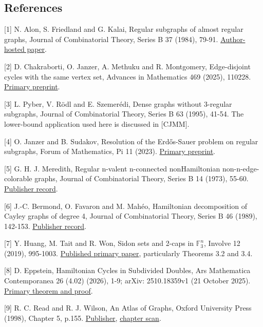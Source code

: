 \documentclass[
  11pt,
]{article}
\begin{document}
\subsection{References}\label{references}

{[}1{]} N. Alon, S. Friedland and G. Kalai, Regular subgraphs of almost
regular graphs, Journal of Combinatorial Theory, Series B 37 (1984),
79-91.
\href{https://web.math.princeton.edu/~nalon/PDFS/Publications/Regular\%20subgraphs\%20of\%20almost\%20regular\%20graphs.pdf}{Author-hosted
paper}.

{[}2{]} D. Chakraborti, O. Janzer, A. Methuku and R. Montgomery,
Edge-disjoint cycles with the same vertex set, Advances in Mathematics
469 (2025), 110228. \href{https://arxiv.org/abs/2404.07190}{Primary
preprint}.

{[}3{]} L. Pyber, V. Rödl and E. Szemerédi, Dense graphs without
3-regular subgraphs, Journal of Combinatorial Theory, Series B 63
(1995), 41-54. The lower-bound application used here is discussed in
{[}CJMM{]}.

{[}4{]} O. Janzer and B. Sudakov, Resolution of the Erdős-Sauer problem
on regular subgraphs, Forum of Mathematics, Pi 11 (2023).
\href{https://arxiv.org/abs/2204.12455}{Primary preprint}.

{[}5{]} G. H. J. Meredith, Regular n-valent n-connected nonHamiltonian
non-n-edge-colorable graphs, Journal of Combinatorial Theory, Series B
14 (1973), 55-60.
\href{https://doi.org/10.1016/S0095-8956(73)80006-1}{Publisher record}.

{[}6{]} J.-C. Bermond, O. Favaron and M. Mahéo, Hamiltonian
decomposition of Cayley graphs of degree 4, Journal of Combinatorial
Theory, Series B 46 (1989), 142-153.
\href{https://doi.org/10.1016/0095-8956(89)90040-3}{Publisher record}.

{[}7{]} Y. Huang, M. Tait and R. Won, Sidon sets and 2-caps in
\(\mathbb F_3^n\), Involve 12 (2019), 995-1003.
\href{https://msp.org/involve/2019/12-6/involve-v12-n6-p06-p.pdf}{Published
primary paper}, particularly Theorems 3.2 and 3.4.

{[}8{]} D. Eppstein, Hamiltonian Cycles in Subdivided Doubles, Ars
Mathematica Contemporanea 26 (4.02) (2026), 1-9; arXiv: 2510.18359v1 (21
October 2025). \href{https://arxiv.org/html/2510.18359v1}{Primary
theorem and proof}.

{[}9{]} R. C. Read and R. J. Wilson, An Atlas of Graphs, Oxford
University Press (1998), Chapter 5, p.155.
\href{https://academic.oup.com/book/54439}{Publisher},
\href{https://oeis.org/A000088/a000088_14.pdf}{chapter scan}.
\end{document}
